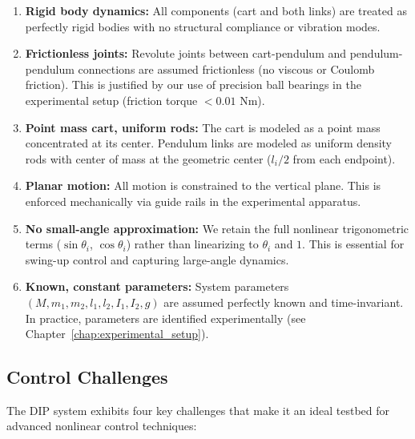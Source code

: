 \begin{enumerate}
\item \textbf{Rigid body dynamics:} All components (cart and both links) are treated as perfectly rigid bodies with no structural compliance or vibration modes.

\item \textbf{Frictionless joints:} Revolute joints between cart-pendulum and pendulum-pendulum connections are assumed frictionless (no viscous or Coulomb friction). This is justified by our use of precision ball bearings in the experimental setup (friction torque $< 0.01$ Nm).

\item \textbf{Point mass cart, uniform rods:} The cart is modeled as a point mass concentrated at its center. Pendulum links are modeled as uniform density rods with center of mass at the geometric center ($l_i/2$ from each endpoint).

\item \textbf{Planar motion:} All motion is constrained to the vertical plane. This is enforced mechanically via guide rails in the experimental apparatus.

\item \textbf{No small-angle approximation:} We retain the full nonlinear trigonometric terms ($ \sin\theta_i$, $\cos\theta_i$) rather than linearizing to $\theta_i$ and $1$. This is essential for swing-up control and capturing large-angle dynamics.

\item \textbf{Known, constant parameters:} System parameters $(M, m_1, m_2, l_1, l_2, I_1, I_2, g)$ are assumed perfectly known and time-invariant. In practice, parameters are identified experimentally (see Chapter~\ref{chap:experimental_setup}).
\end{enumerate}

\subsection{Control Challenges}

The DIP system exhibits four key challenges that make it an ideal testbed for advanced nonlinear control techniques:

